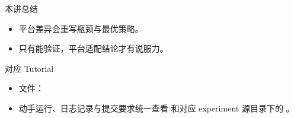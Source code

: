 \begin{frame}{本讲总结}
  \begin{itemize}
    \item 平台差异会重写瓶颈与最优策略。
    \item 只有能验证，平台适配结论才有说服力。
  \end{itemize}
\end{frame}

\begin{frame}{对应 Tutorial}
  \begin{itemize}
    \item 文件：\texttt{}
    \item 动手运行、日志记录与提交要求统一查看 \texttt{} 和对应 experiment 源目录下的 \texttt{}。
  \end{itemize}
\end{frame}

